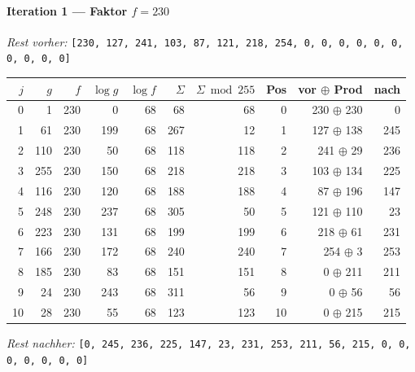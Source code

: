 \paragraph{Iteration 1 — Faktor $f = 230$}
\textit{Rest vorher:} \texttt{[230, 127, 241, 103, 87, 121, 218, 254, 0, 0, 0, 0, 0, 0, 0, 0, 0, 0]}\par
\begin{center}
\footnotesize
\setlength{\tabcolsep}{4pt}
\renewcommand{\arraystretch}{1.1}
\begin{tabular}{r|rr|rrrr|rrr}
\toprule
$j$ & $g$ & $f$ & $\log g$ & $\log f$ & $\Sigma$ & $\Sigma\bmod 255$ & Pos & vor $\oplus$ Prod & nach \\
\midrule
0 & 1 & 230 & 0 & 68 & 68 & 68 & 0 & 230 $\oplus$ 230 & 0 \\
1 & 61 & 230 & 199 & 68 & 267 & 12 & 1 & 127 $\oplus$ 138 & 245 \\
2 & 110 & 230 & 50 & 68 & 118 & 118 & 2 & 241 $\oplus$ 29 & 236 \\
3 & 255 & 230 & 150 & 68 & 218 & 218 & 3 & 103 $\oplus$ 134 & 225 \\
4 & 116 & 230 & 120 & 68 & 188 & 188 & 4 & 87 $\oplus$ 196 & 147 \\
5 & 248 & 230 & 237 & 68 & 305 & 50 & 5 & 121 $\oplus$ 110 & 23 \\
6 & 223 & 230 & 131 & 68 & 199 & 199 & 6 & 218 $\oplus$ 61 & 231 \\
7 & 166 & 230 & 172 & 68 & 240 & 240 & 7 & 254 $\oplus$ 3 & 253 \\
8 & 185 & 230 & 83 & 68 & 151 & 151 & 8 & 0 $\oplus$ 211 & 211 \\
9 & 24 & 230 & 243 & 68 & 311 & 56 & 9 & 0 $\oplus$ 56 & 56 \\
10 & 28 & 230 & 55 & 68 & 123 & 123 & 10 & 0 $\oplus$ 215 & 215 \\
\bottomrule
\end{tabular}
\end{center}
\textit{Rest nachher:} \texttt{[0, 245, 236, 225, 147, 23, 231, 253, 211, 56, 215, 0, 0, 0, 0, 0, 0, 0]}\par\medskip
